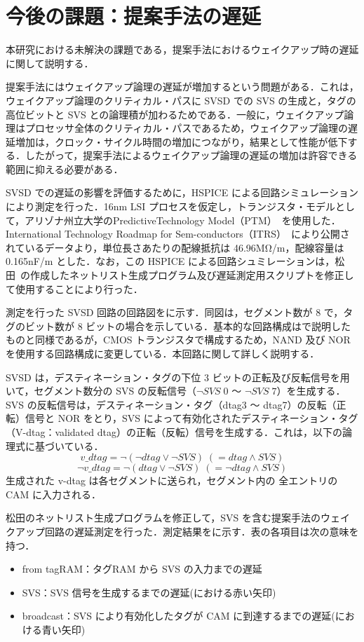 
\chapter{今後の課題：提案手法の遅延}
\label{sec:appendix3}
本研究における未解決の課題である，提案手法におけるウェイクアップ時の遅延に関して説明する．

提案手法にはウェイクアップ論理の遅延が増加するという問題がある．これは，ウェイクアップ論理のクリティカル・パスに SVSD での SVS の生成と，タグの高位ビットと SVS との論理積が加わるためである．一般に，ウェイクアップ論理はプロセッサ全体のクリティカル・パスであるため，ウェイクアップ論理の遅延増加は，クロック・サイクル時間の増加につながり，結果として性能が低下する．したがって，提案手法によるウェイクアップ論理の遅延の増加は許容できる範囲に抑える必要がある．

SVSD での遅延の影響を評価するために，HSPICE による回路シミュレーションにより測定を行った．16nm LSI プロセスを仮定し，トランジスタ・モデルとして，アリゾナ州立大学のPredictiveTechnology Model（PTM）~\cite{model2012}を使用した．International Technology Roadmap for Sem-conductors（ITRS）~\cite{itrs2012}により公開されているデータより，単位長さあたりの配線抵抗は 46.96MΩ/m，配線容量は 0.165nF/m とした．なお，この HSPICE による回路シュミレーションは，松田~\cite{matsuda-thesis}の作成したネットリスト生成プログラム及び遅延測定用スクリプトを修正して使用することにより行った． 

測定を行った SVSD 回路の回路図をに示す．同図は，セグメント数が 8 で，タグのビット数が 8 ビットの場合を示している．基本的な回路構成はで説明したものと同様であるが，CMOS トランジスタで構成するため，NAND 及び NOR を使用する回路構成に変更している．本回路に関して詳しく説明する．

SVSD は，デスティネーション・タグの下位 3 ビットの正転及び反転信号を用いて，セグメント数分の SVS の反転信号（$\lnot SVS\;0$ 〜 $\lnot SVS\;7$）を生成する． SVS の反転信号は，デスティネーション・タグ（dtag3 〜 dtag7）の反転（正転）信号と NOR をとり，SVS によって有効化されたデスティネーション・タグ（V-dtag：validated dtag）の正転（反転）信号を生成する．これは，以下の論理式に基づいている．
\[
  v\_dtag = \lnot (\lnot dtag \lor \lnot SVS) \; (= dtag \land SVS) 
\]
\[
  \lnot v\_dtag = \lnot (dtag \lor \lnot SVS) \; (= \lnot dtag \land SVS) 
\]
生成された v-dtag は各セグメントに送られ，セグメント内の 全エントリの CAM に入力される．

松田のネットリスト生成プログラムを修正して，SVS を含む提案手法のウェイクアップ回路の遅延測定を行った．測定結果をに示す．表の各項目は次の意味を持つ．
  \begin{itemize}
    \item from tagRAM：タグRAM から SVS  の入力までの遅延
    \item SVS：SVS 信号を生成するまでの遅延(における赤い矢印)
    \item broadcast：SVS により有効化したタグが CAM に到達するまでの遅延(における青い矢印) 
  \end{itemize}

